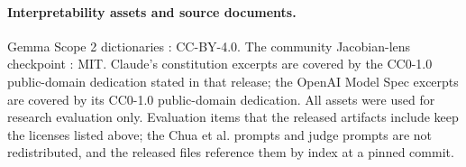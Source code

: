 \paragraph{Interpretability assets and source documents.}
Gemma Scope 2 dictionaries \citep{gemmascope2}: CC-BY-4.0. The community
Jacobian-lens checkpoint \citep{neuronpedia2026jlens}: MIT. Claude's
constitution excerpts \citep{claude2026constitution} are covered by the
CC0-1.0 public-domain dedication stated in that release; the OpenAI Model Spec
excerpts \citep{openai2025modelspec} are covered by its CC0-1.0 public-domain
dedication. All assets were used for research evaluation only. Evaluation items that the released artifacts include keep the licenses listed above; the Chua et al. prompts and judge prompts are not redistributed, and the released files reference them by index at a pinned commit.
